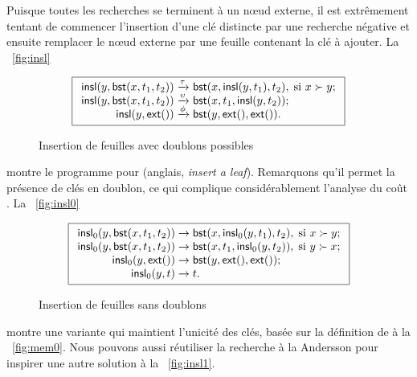 Puisque toutes les recherches se terminent à un n{\oe}ud externe, il
est extrêmement tentant de commencer l'insertion d'une clé distincte
par une recherche négative et ensuite remplacer le n{\oe}ud externe
par une feuille contenant la clé à ajouter. La \fig~\vref{fig:insl}
\begin{figure}[b]
\begin{equation*}
\boxed{
\begin{array}{r@{\;}l@{\;}l}
\fun{insl}(y,\fun{bst}(x,t_1,t_2)) & \xrightarrow{\smash{\tau}} &
  \fun{bst}(x,\fun{insl}(y,t_1),t_2), \; \text{si \(x \succ y\)};\\
\fun{insl}(y,\fun{bst}(x,t_1,t_2)) & \xrightarrow{\smash{\upsilon}} &
  \fun{bst}(x,t_1,\fun{insl}(y,t_2));\\
\fun{insl}(y,\fun{ext}()) & \xrightarrow{\smash{\phi}} & \fun{bst}(y,\fun{ext}(),\fun{ext}()).
\end{array}}
\end{equation*}
\caption{Insertion de feuilles avec doublons possibles\label{fig:insl}}
\end{figure}
montre le programme pour 
(anglais, \emph{insert a leaf}). Remarquons qu'il permet la présence
de clés en doublon, ce qui complique considérablement l'analyse du
coût \citep{Burge_1976,ArchibaldClement_2006,Pasanen_2010}.  La
\fig~\vref{fig:insl0}
\begin{figure}
\begin{equation*}
\boxed{
\begin{array}{r@{\;}l@{\;}l}
\fun{insl}_0(y,\fun{bst}(x,t_1,t_2)) & \rightarrow &
  \fun{bst}(x,\fun{insl}_0(y,t_1),t_2), \; \text{si \(x \succ y\)};\\
\fun{insl}_0(y,\fun{bst}(x,t_1,t_2)) & \rightarrow &
  \fun{bst}(x,t_1,\fun{insl}_0(y,t_2)) , \; \text{si \(y \succ x\)};\\
\fun{insl}_0(y,\fun{ext}()) & \rightarrow &
\fun{bst}(y,\fun{ext}(),\fun{ext}());\\
\fun{insl}_0(y,t) & \rightarrow & t.
\end{array}}
\end{equation*}
\caption{Insertion de feuilles sans doublons\label{fig:insl0}}
\end{figure}
montre une variante qui maintient l'unicité des clés, basée sur la
définition de  à la
\fig~\vref{fig:mem0}. Nous pouvons aussi réutiliser la recherche à la
Andersson pour inspirer une autre solution à la
\fig~\vref{fig:insl1}.
